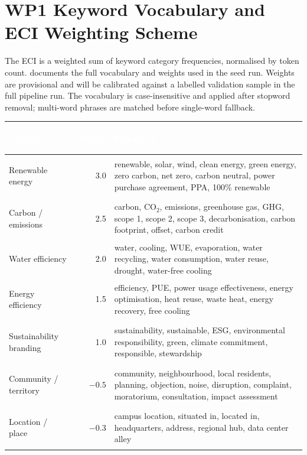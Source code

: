 \section{WP1 Keyword Vocabulary and ECI Weighting Scheme}
\label{app:vocabulary}

The ECI is a weighted sum of keyword category frequencies, normalised by token count.
 documents the full vocabulary and weights used in the seed run.
Weights are provisional and will be calibrated against a labelled validation sample
in the full pipeline run. The vocabulary is case-insensitive and applied after stopword
removal; multi-word phrases are matched before single-word fallback.

\begin{fullwidth}
\footnotesize
{}
\setlength{\tabcolsep}{4pt}
\renewcommand{\arraystretch}{1.1}
\begin{tabularx}{\linewidth}{>{\bfseries\raggedright}p{3.5cm}rX}
\toprule
\rowcolor{dcblue}
\textcolor{white}{\textbf{Category}} &
\textcolor{white}{\textbf{Weight}} &
\textcolor{white}{\textbf{Keywords}} \\
\midrule
Renewable energy &
  3.0 &
  renewable, solar, wind, clean energy, green energy, zero carbon, net zero,
  carbon neutral, power purchase agreement, PPA, 100\% renewable \\
\addlinespace[2pt]
\rowcolor{dcgray}
Carbon / emissions &
  2.5 &
  carbon, CO$_2$, emissions, greenhouse gas, GHG, scope 1, scope 2, scope 3,
  decarbonisation, carbon footprint, offset, carbon credit \\
\addlinespace[2pt]
Water efficiency &
  2.0 &
  water, cooling, WUE, evaporation, water recycling, water consumption,
  water reuse, drought, water-free cooling \\
\addlinespace[2pt]
\rowcolor{dcgray}
Energy efficiency &
  1.5 &
  efficiency, PUE, power usage effectiveness, energy optimisation, heat reuse,
  waste heat, energy recovery, free cooling \\
\addlinespace[2pt]
Sustainability branding &
  1.0 &
  sustainability, sustainable, ESG, environmental responsibility, green,
  climate commitment, responsible, stewardship \\
\addlinespace[2pt]
\rowcolor{dcgray}
Community / territory &
  $-0.5$ &
  community, neighbourhood, local residents, planning, objection, noise,
  disruption, complaint, moratorium, consultation, impact assessment \\
\addlinespace[2pt]
Location / place &
  $-0.3$ &
  campus location, situated in, located in, headquarters, address,
  regional hub, data center alley \\
\bottomrule
\end{tabularx}
\end{fullwidth}
